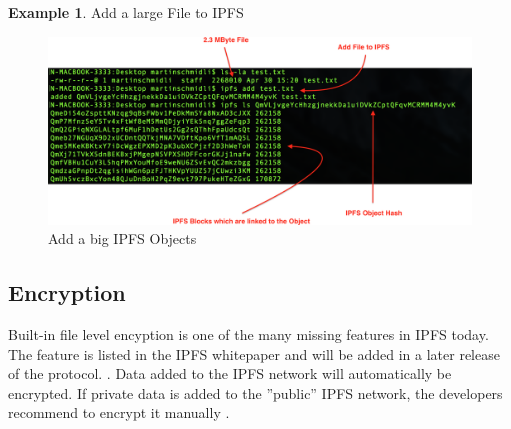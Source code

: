 \documentclass[a4paper,11pt, oneside]{report}
\theoremstyle{definition}
\newtheorem{exmp}{Example}[subsection]
\begin{document}
\newpage
\begin{exmp}Add a large File to IPFS \\
\begin{figure}[H]
\centering
\includegraphics[width=\textwidth]{img/ipfs-object-example.png}
\caption[IPFS Objects Example]{Add a big IPFS Objects}
\end{figure}
\end{exmp}

\subsection{Encryption}
Built-in file level encyption is one of the many missing features in IPFS today. The feature is listed in the IPFS whitepaper and will be added in a later release of the protocol. \cite{Encryption}. Data added to the IPFS network will automatically be encrypted. If private data is added to the ''public'' IPFS network, the developers recommend to encrypt it manually \cite{EncryptionManual}.

\newpage
\end{document}
